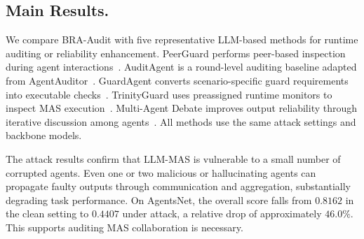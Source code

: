 \documentclass[letterpaper]{article} %
\begin{document}
\subsection{Main Results.}

We compare BRA-Audit with five representative LLM-based methods for runtime auditing or reliability enhancement. PeerGuard performs peer-based inspection during agent interactions~\citep{fan2025peerguard}. AuditAgent is a round-level auditing baseline adapted from AgentAuditor~\citep{yang2026agentauditor}. GuardAgent converts scenario-specific guard requirements into executable checks~\citep{xiang2024guardagent}. TrinityGuard uses preassigned runtime monitors to inspect MAS execution~\citep{wang2026trinityguard}. Multi-Agent Debate improves output reliability through iterative discussion among agents~\citep{du2024multiagentdebate}. All methods use the same attack settings and backbone models.



The attack results confirm that LLM-MAS is vulnerable to a small number
of corrupted agents. Even one or two malicious or hallucinating agents
can propagate faulty outputs through communication and aggregation,
substantially degrading task performance. On AgentsNet, the overall
score falls from \(0.8162\) in the clean setting to \(0.4407\) under
attack, a relative drop of approximately \(46.0\%\). This supports auditing MAS collaboration is necessary.
\end{document}
